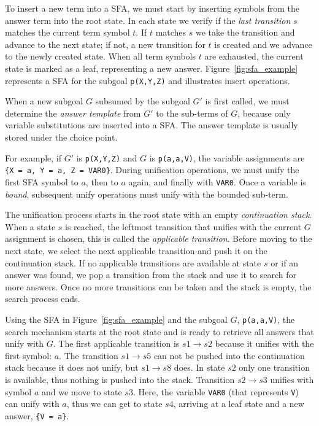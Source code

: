 To insert a new term into a SFA, we must start by inserting symbols from the answer term into the root state.
In each state we verify if the \textit{last transition} $s$ matches the current term symbol $t$. If $t$ matches $s$
we take the transition and advance to the next state; if not, a new transition for $t$ is created and we advance
to the newly created state. When all term symbols $t$ are exhausted, the current state is marked as a leaf,
representing a new answer.
Figure~\ref{fig:sfa_example} represents a SFA for the subgoal \texttt{p(X,Y,Z)} and
illustrates insert operations.

When a new subgoal $G$ subsumed by the subgoal $G'$ is first called, we must determine the \textit{answer template}
from $G'$ to the sub-terms of $G$, because only variable substitutions are inserted into a SFA.
The answer template is usually stored under the choice point.

For example, if $G'$ is \texttt{p(X,Y,Z)} and $G$ is \texttt{p(a,a,V)}, the variable assignments
are \texttt{\{X~=~a,~Y~=~a,~Z~=~VAR0\}}. During unification operations, we must unify the first SFA symbol
to $a$, then to $a$ again, and finally with \texttt{VAR0}.
Once a variable is \textit{bound}, subsequent unify operations must unify with the bounded sub-term.

The unification process starts in the root state with an empty \textit{continuation stack}.
When a state $s$ is reached, the leftmost transition that unifies with the current $G$ assignment is chosen,
this is called the \textit{applicable transition}.
Before moving to the next state, we select the next applicable transition and push it on the continuation stack.
If no applicable transitions are available at state $s$ or if an answer was found, we pop a transition from
the stack and use it to search for more answers. Once no more transitions can be taken and the stack is empty, the
search process ends.

Using the SFA in Figure~\ref{fig:sfa_example} and the subgoal $G$, \texttt{p(a,a,V)}, the search mechanism starts
at the root state and is ready to retrieve all answers that unify with $G$.
The first applicable transition is $s1 \rightarrow s2$ because it unifies with the first symbol: $a$. The transition
$s1 \rightarrow s5$ can not be pushed into the continuation stack because it does not unify, but $s1 \rightarrow s8$ does.
In state $s2$ only one transition is available, thus nothing is pushed into the stack.
Transition $s2 \rightarrow s3$ unifies with symbol $a$ and we move to state $s3$. Here, the variable \texttt{VAR0} (that represents \texttt{V})
can unify with $a$, thus we can get to state $s4$, arriving at a leaf state and a new answer, \texttt{\{V~=~a\}}.

